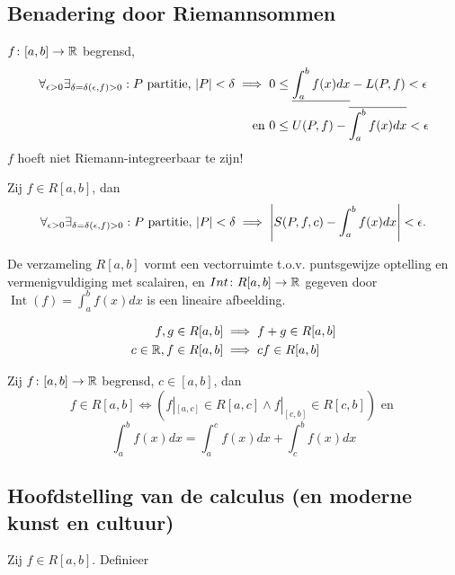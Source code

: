 \documentclass{2wa40summary}
\begin{document}
		\subsection{Benadering door Riemannsommen}
			\begin{theorem}
				$ f\colon [a,b] \to \mathbb{R}  $ begrensd,
				\begin{align*}
					\forall_{\epsilon >0} \exists_{\delta = \delta (\epsilon,f)>0}: P \text{ partitie, } \abs{P}<\delta \implies 0 &\le \ul{\int_a^b f(x) dx} - L(P,f) < \epsilon  \\
					\text{ en }0 &\le U(P,f) - \overline{\int_a^b f(x)dx} <\epsilon
				 \end{align*}
				 \opm $f$ hoeft niet Riemann-integreerbaar te zijn!
			\end{theorem}
			\begin{theorem}
				Zij $ f \in R[a,b] $, dan
				\[ 
					\forall_{\epsilon >0} \exists_{\delta = \delta (\epsilon,f)>0}: P \text{ partitie, } \abs{P}<\delta \implies \abs{S(P,f,c) - \int_a^b f(x) dx} < \epsilon.
				 \]
			\end{theorem}
			\begin{theorem}[\text{[K]} 6.3.1]
				De verzameling $R[a,b]$ vormt een vectorruimte t.o.v. puntsgewijze optelling en vermenigvuldiging met scalairen, en $ \mathop{Int}\colon R[a,b] \to \mathbb{R} $ gegeven door $ \mathop{Int}(f) = \int_a^b f(x)dx $ is een lineaire afbeelding.
				\begin{gevolg}
					\begin{align*}
						f,g \in R[a,b] &\implies f+g \in R[a,b] \\
						c \in \mathbb{R}, f\in R[a,b] &\implies cf \in R[a,b]
					 \end{align*}
				\end{gevolg}
			\end{theorem}
			\begin{theorem}
				Zij $f\colon [a,b] \to \mathbb{R}$ begrensd, $c\in [a,b]$, dan
				\[ 
					f \in R[a,b] \iff (f|_{[a,c]} \in R[a,c] \wedge f|_{[c,b]} \in R[c,b]) \text{ en }
				 \]
				 \[ 
					 \int_a^b f(x)dx = \int_a^c f(x) dx + \int_c^b f(x) dx
				  \]
			\end{theorem}
			
		\subsection{Hoofdstelling van de calculus (en moderne kunst en cultuur)}
			\begin{theorem}
				Zij $f \in R[a,b]$. Definieer 
				
			\end{theorem}
		
\end{document}
